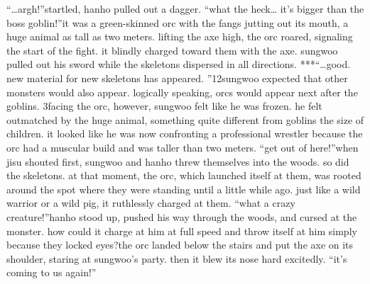 “…argh!”startled, hanho pulled out a dagger.
“what the heck… it’s bigger than the boss goblin!”it was a green-skinned orc with the fangs jutting out its mouth, a huge animal as tall as two meters.
lifting the axe high, the orc roared, signaling the start of the fight.
 it blindly charged toward them with the axe.
 sungwoo pulled out his sword while the skeletons dispersed in all directions.
***“…good.
 new material for new skeletons has appeared.
”12sungwoo expected that other monsters would also appear.
 logically speaking, orcs would appear next after the goblins.
3facing the orc, however, sungwoo felt like he was frozen.
 he felt outmatched by the huge animal, something quite different from goblins the size of children.
 it looked like he was now confronting a professional wrestler because the orc had a muscular build and was taller than two meters.
“get out of here!”when jisu shouted first, sungwoo and hanho threw themselves into the woods.
 so did the skeletons.
 at that moment, the orc, which launched itself at them, was rooted around the spot where they were standing until a little while ago.
 just like a wild warrior or a wild pig, it ruthlessly charged at them.
“what a crazy creature!”hanho stood up, pushed his way through the woods, and cursed at the monster.
 how could it charge at him at full speed and throw itself at him simply because they locked eyes?the orc landed below the stairs and put the axe on its shoulder, staring at sungwoo’s party.
 then it blew its nose hard excitedly.
“it’s coming to us again!”

 